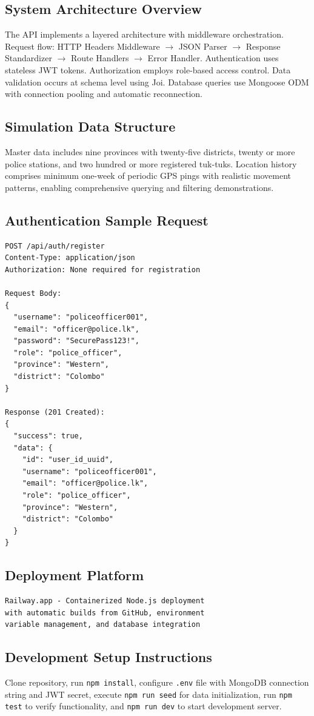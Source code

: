 \documentclass[12pt,a4paper]{article}
\begin{document}
\subsection*{System Architecture Overview}

The API implements a layered architecture with middleware orchestration. Request flow: HTTP Headers Middleware $\rightarrow$ JSON Parser $\rightarrow$ Response Standardizer $\rightarrow$ Route Handlers $\rightarrow$ Error Handler. Authentication uses stateless JWT tokens. Authorization employs role-based access control. Data validation occurs at schema level using Joi. Database queries use Mongoose ODM with connection pooling and automatic reconnection.

\subsection*{Simulation Data Structure}

Master data includes nine provinces with twenty-five districts, twenty or more police stations, and two hundred or more registered tuk-tuks. Location history comprises minimum one-week of periodic GPS pings with realistic movement patterns, enabling comprehensive querying and filtering demonstrations.

\subsection*{Authentication Sample Request}

\begin{verbatim}
POST /api/auth/register
Content-Type: application/json
Authorization: None required for registration

Request Body:
{
  "username": "policeofficer001",
  "email": "officer@police.lk",
  "password": "SecurePass123!",
  "role": "police_officer",
  "province": "Western",
  "district": "Colombo"
}

Response (201 Created):
{
  "success": true,
  "data": {
    "id": "user_id_uuid",
    "username": "policeofficer001",
    "email": "officer@police.lk",
    "role": "police_officer",
    "province": "Western",
    "district": "Colombo"
  }
}
\end{verbatim}

\subsection*{Deployment Platform}
\begin{verbatim}
Railway.app - Containerized Node.js deployment 
with automatic builds from GitHub, environment 
variable management, and database integration
\end{verbatim}

\subsection*{Development Setup Instructions}

Clone repository, run \texttt{npm install}, configure \texttt{.env} file with MongoDB connection string and JWT secret, execute \texttt{npm run seed} for data initialization, run \texttt{npm test} to verify functionality, and \texttt{npm run dev} to start development server.
\end{document}

